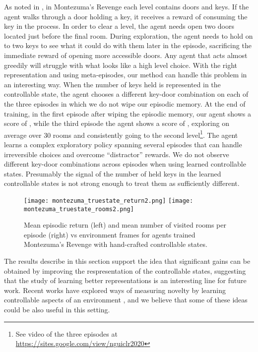 \documentclass{article} \usepackage{iclr2020_conference,times}
\begin{document}
As noted in \citet{burda2018exploration}, in Montezuma's Revenge each level contains  doors and  keys. If the agent walks through a door holding a key, it receives a reward of  consuming the key in the process. In order to clear a level, the agent needs open two doors located just before the final room. 
During exploration, the agent needs to hold on to two keys to see what it could do with them later in the episode, sacrificing the immediate reward of opening more accessible doors. Any agent that acts almost greedily will struggle with what looks like a high level choice. 
With the right representation and using meta-episodes, our method can handle this problem in an interesting way. When the number of keys held is represented in the controllable state, the agent chooses a different key-door combination on each of the three episodes in which we do not wipe our episodic memory.
At the end of training, in the first episode after wiping the episodic memory, our agent shows a score of , while the third episode the agent shows a score of , exploring on average over 30 rooms and consistently going to the second level\footnote{See video of the three episodes at \url{https://sites.google.com/view/nguiclr2020}}.
The agent learns a complex exploratory policy spanning several episodes that can handle irreversible choices and overcome  ``distractor'' rewards. 
We do not observe different key-door combinations across episodes when using learned controllable states. Presumably the signal of the number of held keys in the learned controllable states is not strong enough to treat them as sufficiently different.

\begin{figure}[!tbp]
    \centering
    \texttt{[image: montezuma\_truestate\_return2.png]}
    \hfill
    \texttt{[image: montezuma\_truestate\_rooms2.png]}
    \caption{Mean episodic return (left) and mean number
of visited rooms per episode (right) vs environment frames for agents trained
Montezuma’s Revenge with hand-crafted controllable states.
}
    \label{initial_results}
\vspace{-3ex}
\end{figure}
The results describe in this section support the idea that significant gains can be obtained by improving the respresentation of the controllable states, suggesting that the study of learning better representations is an interesting line for future work.
Recent works have explored ways of measuring novelty by learning controllable aspects of an environment \citep{kim2018emi, warde2018unsupervised}, and we believe that some of these ideas could be also useful in this setting.
\end{document}
